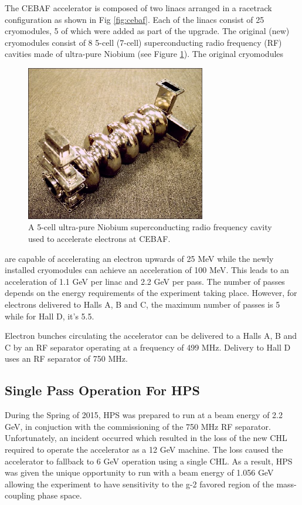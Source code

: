 The CEBAF accelerator is composed of two linacs arranged in a racetrack
configuration as shown in Fig \ref{fig:cebaf}. Each of the linacs consist
of 25 cryomodules, 5 of which were added as part of the upgrade.  The original
(new) cryomodules consist of 8 5-cell (7-cell) superconducting radio frequency
(RF) cavities made of ultra-pure Niobium (see Figure \ref{fig:cebaf_cavity}).  
The original cryomodules
\begin{figure}[h]
    \centering
    \includegraphics[width=0.7\textwidth]{images/cebaf_cavity.jpg}
    \caption{A 5-cell ultra-pure Niobium superconducting radio frequency cavity
             used to accelerate electrons at CEBAF.}
    \label{fig:cebaf_cavity}
\end{figure}
are capable of accelerating an electron upwards of 25 MeV while the newly installed
cryomodules can achieve an acceleration of 100 MeV.  This leads to an acceleration
of 1.1 GeV per linac and 2.2 GeV per pass. The 
number of passes depends on the energy requirements of the experiment taking place.
However, for electrons delivered to Halls A, B and C, the maximum number of passes
is 5 while for Hall D, it's 5.5.

Electron bunches circulating the accelerator can be delivered to a Halls A, B
and C by an RF separator operating at a frequency of 499 MHz.  Delivery to Hall
D uses an RF separator of 750 MHz.

\subsection{Single Pass Operation For HPS}

During the Spring of 2015, HPS was prepared to run at a beam energy of 2.2 GeV,
in conjuction with the commissioning of the 750 MHz RF separator.
Unfortunately, an incident occurred which resulted in the loss of the new CHL
required to operate the accelerator as a 12 GeV machine.
The loss caused the accelerator to 
fallback to 6 GeV operation using a single CHL.  As a result, HPS was given
the unique opportunity to run with a beam energy of 1.056 GeV allowing the
experiment to have sensitivity to the g-2 favored region of the mass-coupling
phase space.  


